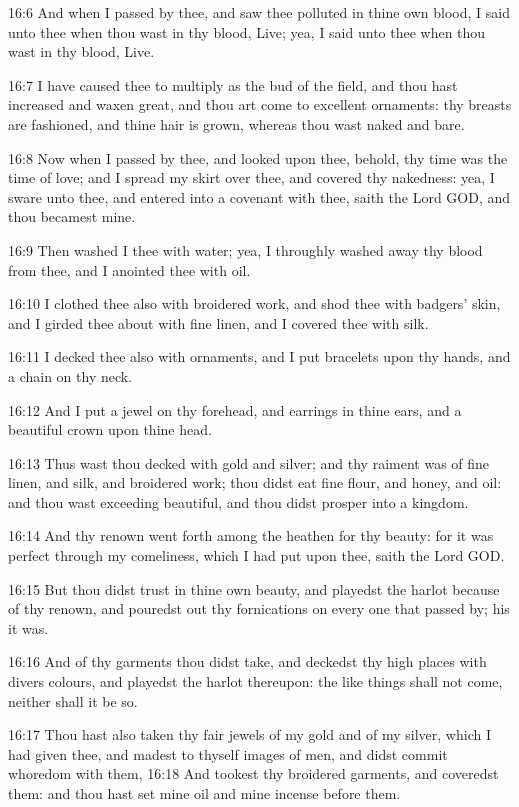 16:6 And when I passed by thee, and saw thee polluted in thine own blood, I said unto thee when thou wast in thy blood, Live; yea, I said unto thee when thou wast in thy blood, Live.

16:7 I have caused thee to multiply as the bud of the field, and thou hast increased and waxen great, and thou art come to excellent ornaments: thy breasts are fashioned, and thine hair is grown, whereas thou wast naked and bare.

16:8 Now when I passed by thee, and looked upon thee, behold, thy time was the time of love; and I spread my skirt over thee, and covered thy nakedness: yea, I sware unto thee, and entered into a covenant with thee, saith the Lord GOD, and thou becamest mine.

16:9 Then washed I thee with water; yea, I throughly washed away thy blood from thee, and I anointed thee with oil.

16:10 I clothed thee also with broidered work, and shod thee with badgers' skin, and I girded thee about with fine linen, and I covered thee with silk.

16:11 I decked thee also with ornaments, and I put bracelets upon thy hands, and a chain on thy neck.

16:12 And I put a jewel on thy forehead, and earrings in thine ears, and a beautiful crown upon thine head.

16:13 Thus wast thou decked with gold and silver; and thy raiment was of fine linen, and silk, and broidered work; thou didst eat fine flour, and honey, and oil: and thou wast exceeding beautiful, and thou didst prosper into a kingdom.

16:14 And thy renown went forth among the heathen for thy beauty: for it was perfect through my comeliness, which I had put upon thee, saith the Lord GOD.

16:15 But thou didst trust in thine own beauty, and playedst the harlot because of thy renown, and pouredst out thy fornications on every one that passed by; his it was.

16:16 And of thy garments thou didst take, and deckedst thy high places with divers colours, and playedst the harlot thereupon: the like things shall not come, neither shall it be so.

16:17 Thou hast also taken thy fair jewels of my gold and of my silver, which I had given thee, and madest to thyself images of men, and didst commit whoredom with them, 16:18 And tookest thy broidered garments, and coveredst them: and thou hast set mine oil and mine incense before them.

